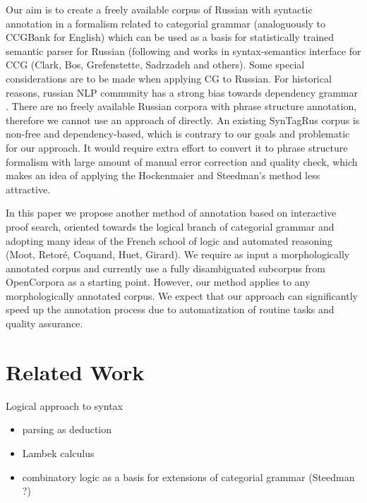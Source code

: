 \documentclass[a4paper]{article}
\theoremstyle{example-style}
\begin{document}
Our aim is to create a freely available corpus of Russian with syntactic annotation in a formalism related to categorial grammar (analoguously to CCGBank for English) which can be used as a basis for statistically trained semantic parser for Russian (following \parencite{clark2007wide} and works in syntax-semantics interface for CCG (Clark, Bos, Grefenstette, Sadrzadeh and others). Some special considerations are to be made when applying CG to Russian. For historical reasons, russian NLP community has a strong bias towards dependency grammar \parencite{toldova2012nlp}. There are no freely available Russian corpora with phrase structure annotation, therefore we cannot use an approach of \parencite{hockenmaier2007ccgbank} directly. An existing SynTagRus corpus \parencite{boguslavsky2002development} is non-free and dependency-based, which is contrary to our goals and problematic for our approach. It would require extra effort to convert it to phrase structure formalism with large amount of manual error correction and quality check, which makes an idea of applying the Hockenmaier and Steedman's method less attractive.
 
In this paper we propose another method of annotation based on interactive proof search, oriented towards the logical branch of categorial grammar and adopting many ideas of the French school of logic and automated reasoning (Moot, Retor\'{e}, Coquand, Huet, Girard). We require as input a morphologically annotated corpus and currently use a fully disambiguated subcorpus from OpenCorpora \parencite{granovsky2010opencorpora} as a starting point. However, our method applies to any morphologically annotated corpus. We expect that our approach can significantly speed up the annotation process due to automatization of routine tasks and quality assurance.
     

\section{Related Work}

Logical approach to syntax
 \begin{itemize}
 	\item parsing as deduction \parencite{pereira1983parsing,kallmeyer2010parsing}
 	\item Lambek calculus \parencite{lambek1958mathematics,lambek1961calculus,konig1989parsing}
 	\item combinatory logic as a basis for extensions of categorial grammar (Steedman ?)
 \end{itemize}
 
\end{document}
